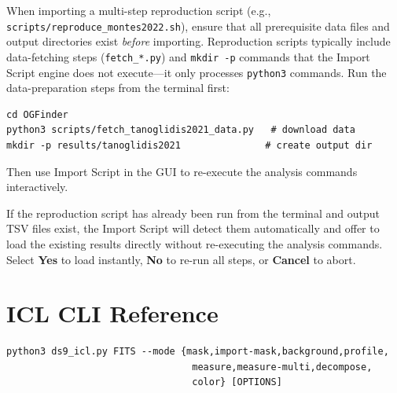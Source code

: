 \documentclass[11pt,fleqn]{book}
\begin{document}
\begin{important}
When importing a multi-step reproduction script (e.g., \texttt{scripts/reproduce\_montes2022.sh}), ensure that all prerequisite data files and output directories exist \emph{before} importing.  Reproduction scripts typically include data-fetching steps (\texttt{fetch\_*.py}) and \texttt{mkdir~-p} commands that the Import Script engine does not execute---it only processes \texttt{python3} commands.  Run the data-preparation steps from the terminal first:
\begin{codebox}
\begin{lstlisting}[style=bash,numbers=none]
cd OGFinder
python3 scripts/fetch_tanoglidis2021_data.py   # download data
mkdir -p results/tanoglidis2021               # create output dir
\end{lstlisting}
\end{codebox}
\noindent Then use Import Script in the GUI to re-execute the analysis commands interactively.
\end{important}

\begin{important}
If the reproduction script has already been run from the terminal and output TSV files exist, the Import Script will detect them automatically and offer to load the existing results directly without re-executing the analysis commands.  Select \textbf{Yes} to load instantly, \textbf{No} to re-run all steps, or \textbf{Cancel} to abort.
\end{important}


\section{ICL CLI Reference}

\begin{codebox}[Synopsis]
\begin{lstlisting}[style=bash,numbers=none]
python3 ds9_icl.py FITS --mode {mask,import-mask,background,profile,
                                 measure,measure-multi,decompose,
                                 color} [OPTIONS]
\end{lstlisting}
\end{codebox}
\end{document}
